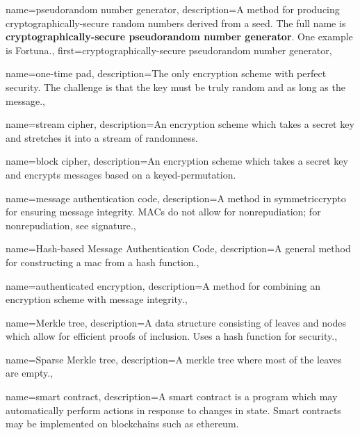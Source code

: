 {
    name={pseudorandom number generator},
    description={A method for producing cryptographically-secure
        random numbers derived from a seed.
        The full name is
        \textbf{cryptographically-secure pseudorandom number generator}.
        One example is Fortuna.},
    first={cryptographically-secure pseudorandom number generator},
}

{
    name={one-time pad},
    description={The only \gls{encryption scheme} with \gls{perfect security}.
        The challenge is that the key must be truly random
        and as long as the message.},
}

{
    name={stream cipher},
    description={An \gls{encryption scheme} which takes a secret key
        and stretches it into a stream of randomness.}
}

{
    name={block cipher},
    description={An \gls{encryption scheme} which takes a secret key
        and encrypts messages based on a keyed-\gls{permutation}.}
}

{
    name={message authentication code},
    description={A method in \gls{symmetriccrypto} for ensuring
        message integrity.
        MACs do not allow for nonrepudiation;
        for nonrepudiation, see \gls{signature}.},
}

{
    name={Hash-based Message Authentication Code},
    description={A general method for constructing
        a \gls{mac} from a \gls{hash function}.},
}

{
    name={authenticated encryption},
    description={A method for combining an \gls{encryption scheme} with
        message integrity.},
}

{
    name={Merkle tree},
    description={A data structure consisting of leaves and nodes
        which allow for efficient proofs of inclusion.
        Uses a \gls{hash function} for security.},
}

{
    name={Sparse Merkle tree},
    description={A \gls{merkle tree} where most of the leaves
        are empty.},
}

{
    name={smart contract},
    description={A smart contract is a program which may automatically
        perform actions in response to changes in state.
        Smart contracts may be implemented on blockchains such as
        \gls{ethereum}.}
}

